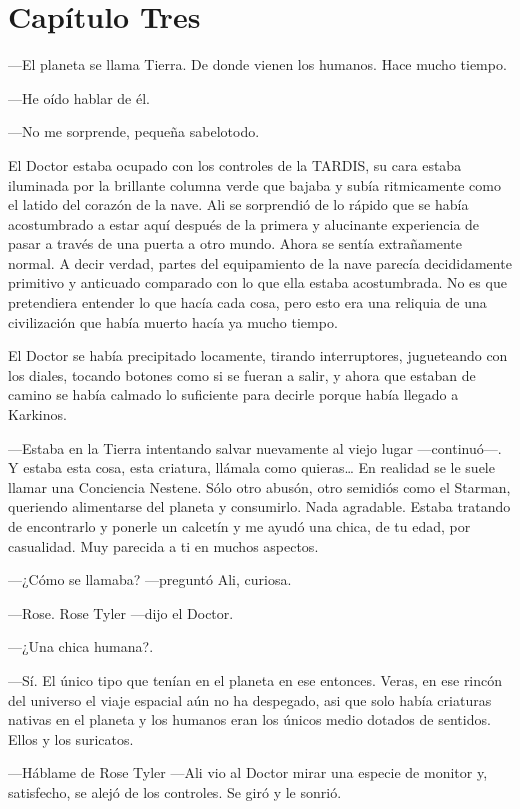 \chapter*{Capítulo Tres}


---El planeta se llama Tierra. De donde vienen los humanos. Hace mucho
tiempo.

---He oído hablar de él.

---No me sorprende, pequeña sabelotodo.

El Doctor estaba ocupado con los controles de la TARDIS, su cara estaba
iluminada por la brillante columna verde que bajaba y subía ritmicamente
como el latido del corazón de la nave. Ali se sorprendió de lo rápido
que se había acostumbrado a estar aquí después de la primera y
alucinante experiencia de pasar a través de una puerta a otro mundo.
Ahora se sentía extrañamente normal. A decir verdad, partes del
equipamiento de la nave parecía decididamente primitivo y anticuado
comparado con lo que ella estaba acostumbrada. No es que pretendiera
entender lo que hacía cada cosa, pero esto era una reliquia de una
civilización que había muerto hacía ya mucho tiempo.

El Doctor se había precipitado locamente, tirando interruptores,
jugueteando con los diales, tocando botones como si se fueran a salir, y
ahora que estaban de camino se había calmado lo suficiente para decirle
porque había llegado a Karkinos.

---Estaba en la Tierra intentando salvar nuevamente al viejo lugar
---continuó---. Y estaba esta cosa, esta criatura, llámala como
quieras\ldots{} En realidad se le suele llamar una Conciencia Nestene.
Sólo otro abusón, otro semidiós como el Starman, queriendo alimentarse
del planeta y consumirlo. Nada agradable. Estaba tratando de encontrarlo
y ponerle un calcetín y me ayudó una chica, de tu edad, por casualidad.
Muy parecida a ti en muchos aspectos.

---¿Cómo se llamaba? ---preguntó Ali, curiosa.

---Rose. Rose Tyler ---dijo el Doctor.

---¿Una chica humana?.

---Sí. El único tipo que tenían en el planeta en ese entonces. Veras, en
ese rincón del universo el viaje espacial aún no ha despegado, asi que
solo había criaturas nativas en el planeta y los humanos eran los únicos
medio dotados de sentidos. Ellos y los suricatos.

---Háblame de Rose Tyler ---Ali vio al Doctor mirar una especie de
monitor y, satisfecho, se alejó de los controles. Se giró y le sonrió.

